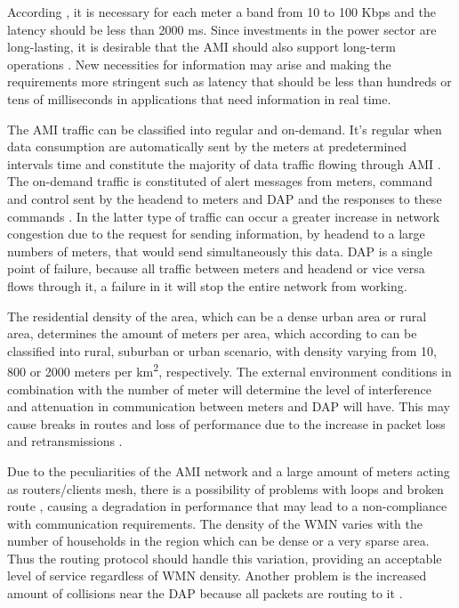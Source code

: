 \documentclass[conference]{IEEEtran}
\begin{document}
According \cite{Gungor2013}, it is necessary for each meter a band from 10 to 100 Kbps and the latency should be less than 2000 ms. Since investments in the power sector are long-lasting, it is desirable that the AMI should also support long-term operations \cite{5484223}. New necessities for information may arise and making the requirements more stringent such as latency that should be less than hundreds or tens of milliseconds in applications that need information in real time.

The AMI traffic can be classified into regular and on-demand. It's regular when data consumption are automatically sent by the meters at predetermined intervals time \cite{Plan2011,4547164} and constitute the majority of data traffic flowing through AMI \cite{5484223}. The on-demand traffic is constituted of alert messages from meters, command and control sent by the headend  to meters and DAP and the responses to these commands \cite{Plan2011}. In the latter type of traffic can occur a greater increase in network congestion due to the request for sending information,  by  headend to a large numbers of meters, that would send simultaneously this data. DAP is a single point of failure, because all traffic between meters and headend or vice versa flows through it, a failure in it will stop the entire network from working.

The residential density of the area, which can be a dense urban area or rural area, determines the amount of meters per area, which according to \cite{Plan2011} can be classified into rural, suburban or urban scenario, with density varying from 10, 800 or 2000 meters per km\textsuperscript{2}, respectively. The external environment conditions in combination with the number of meter will determine the level of interference and attenuation in communication between meters and DAP will have. This may cause breaks in routes and loss of performance due to the increase in packet loss and retransmissions \cite{farooq2013energy}. 


Due to the peculiarities of the AMI network and a large amount of meters acting as routers/clients mesh, there is a possibility of problems with loops and broken route \cite{ramachandran2007routing}, causing a degradation in performance that may lead to a non-compliance with communication requirements. The density of the WMN varies with the number of households in the region which can be dense or a very sparse area. Thus the routing protocol should handle this variation, providing an acceptable level of service regardless of WMN density. Another problem is the increased amount of collisions near the DAP because all packets are routing to it \cite{Saputro2012}.
\end{document}
